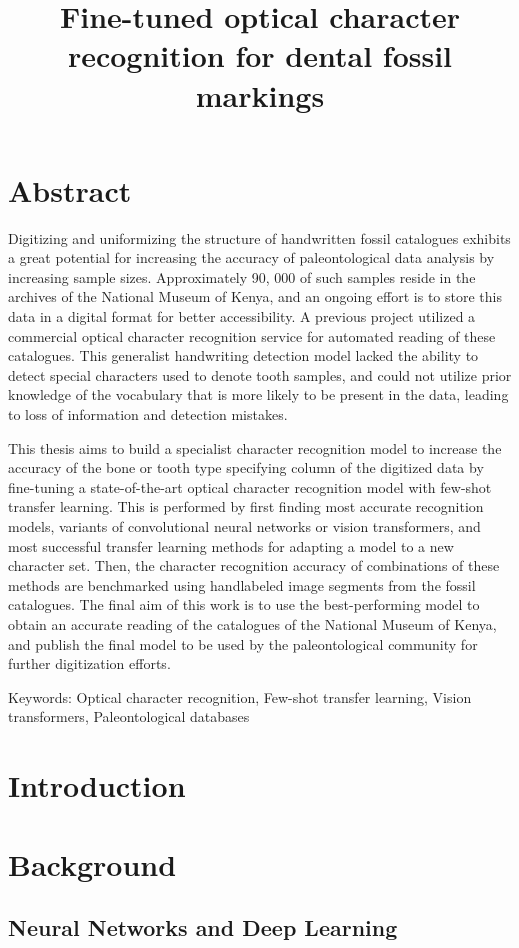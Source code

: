 \documentclass{article}
\title{Fine-tuned optical character recognition for dental fossil markings}
\begin{document}
\tableofcontents

\section{Abstract}
Digitizing and uniformizing the structure of handwritten fossil catalogues exhibits a great 
potential for increasing the accuracy of paleontological data analysis by increasing sample sizes. 
Approximately 90, 000 of such samples reside in the archives of the National Museum of Kenya, and 
an ongoing effort is to store this data in a digital format for better accessibility.
A previous project utilized a commercial optical character recognition service for automated reading of these catalogues. This generalist
handwriting detection model lacked the ability to detect special characters used to denote tooth samples, and could not utilize prior knowledge 
of the vocabulary that is more likely to be present in the data, leading to loss of information and detection mistakes.

This thesis aims to build a specialist character recognition model to increase the accuracy of 
the bone or tooth type specifying column of the digitized data by fine-tuning a state-of-the-art optical 
character recognition model with few-shot transfer learning. This is performed by first finding most accurate
recognition models, variants of convolutional neural networks or vision transformers, and most successful 
transfer learning methods for adapting a model to a new character set. Then, the character 
recognition accuracy of combinations of these methods are benchmarked using handlabeled image segments from the 
fossil catalogues. The final aim of this work is to use the best-performing model 
to obtain an accurate reading of the catalogues of the National Museum of Kenya, and publish the final model to be used 
by the paleontological community for further digitization efforts.

Keywords: Optical character recognition, Few-shot transfer learning, Vision transformers, Paleontological databases

\section{Introduction}

\section{Background}

\subsection{Neural Networks and Deep Learning}
\end{document}
